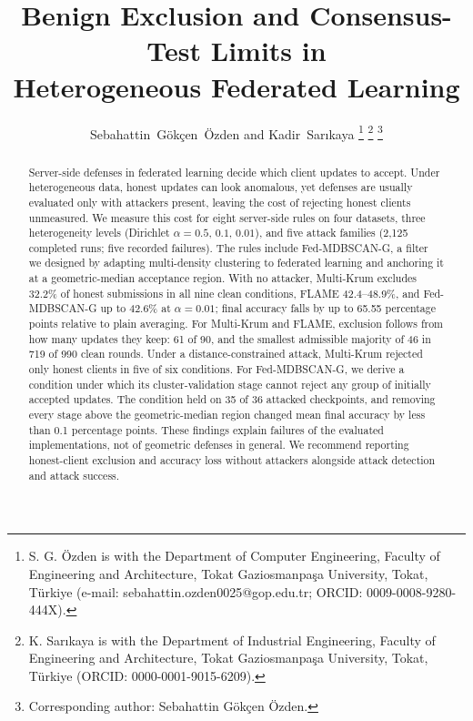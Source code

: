 \documentclass[journal]{IEEEtran}
\begin{document}
\title{Benign Exclusion and Consensus-Test Limits in\\Heterogeneous Federated Learning}

\author{Sebahattin~G\"ok\c{c}en~\"Ozden and Kadir~Sar{\i}kaya%
\thanks{S. G. \"Ozden is with the Department of Computer Engineering, Faculty of Engineering and Architecture, Tokat Gaziosmanpa\c{s}a University, Tokat, T\"urkiye (e-mail: sebahattin.ozden0025@gop.edu.tr; ORCID: \mbox{0009-0008-9280-444X}).}%
\thanks{K. Sar{\i}kaya is with the Department of Industrial Engineering, Faculty of Engineering and Architecture, Tokat Gaziosmanpa\c{s}a University, Tokat, T\"urkiye (ORCID: \mbox{0000-0001-9015-6209}).}%
\thanks{Corresponding author: Sebahattin G\"ok\c{c}en \"Ozden.}}

\maketitle

\begin{abstract}
Server-side defenses in federated learning decide which client updates to accept. Under heterogeneous data, honest updates can look anomalous, yet defenses are usually evaluated only with attackers present, leaving the cost of rejecting honest clients unmeasured. We measure this cost for eight server-side rules on four datasets, three heterogeneity levels (Dirichlet $\alpha=0.5$, $0.1$, $0.01$), and five attack families (2,125 completed runs; five recorded failures). The rules include Fed-MDBSCAN-G, a filter we designed by adapting multi-density clustering to federated learning and anchoring it at a geometric-median acceptance region. With no attacker, Multi-Krum excludes 32.2\% of honest submissions in all nine clean conditions, FLAME 42.4--48.9\%, and Fed-MDBSCAN-G up to 42.6\% at $\alpha=0.01$; final accuracy falls by up to 65.55 percentage points relative to plain averaging. For Multi-Krum and FLAME, exclusion follows from how many updates they keep: 61 of 90, and the smallest admissible majority of 46 in 719 of 990 clean rounds. Under a distance-constrained attack, Multi-Krum rejected only honest clients in five of six conditions. For Fed-MDBSCAN-G, we derive a condition under which its cluster-validation stage cannot reject any group of initially accepted updates. The condition held on 35 of 36 attacked checkpoints, and removing every stage above the geometric-median region changed mean final accuracy by less than 0.1 percentage points. These findings explain failures of the evaluated implementations, not of geometric defenses in general. We recommend reporting honest-client exclusion and accuracy loss without attackers alongside attack detection and attack success.
\end{abstract}
\end{document}
